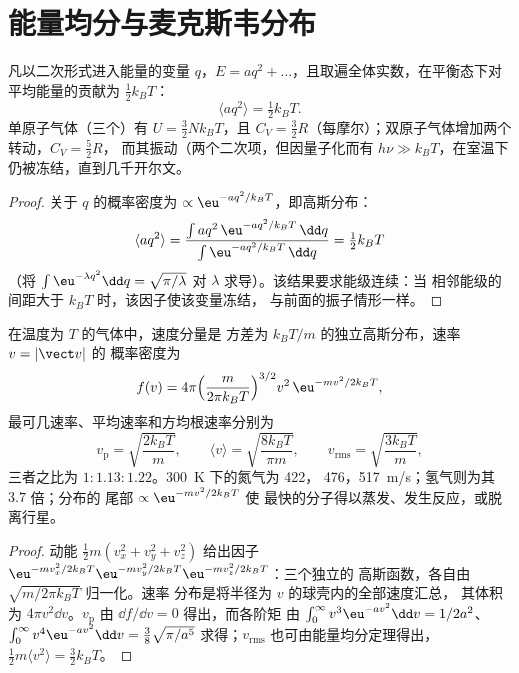 \section{能量均分与麦克斯韦分布}

\begin{theorem}[能量均分定理]\label{thm:b2:boltzmann-factor:equipartition}
凡以二次形式进入能量的变量 $q$，$E = aq^2 +
\dots$，且取遍全体实数，在平衡态下对
平均能量的贡献为 $\tfrac12k_BT$：
\[
\langle aq^2\rangle = \tfrac12k_BT .
\]
单原子气体（三个）有 $U = \tfrac32Nk_BT$，且 $C_V =
\tfrac32R$（每摩尔）；双原子气体增加两个转动，$C_V = \tfrac52R$，
而其振动（两个二次项，但因量子化而有 $h\nu \gg
k_BT$，在室温下仍被冻结，直到几千开尔文。
\end{theorem}

\begin{proof}
关于 $q$ 的概率密度为 $\propto\eu^{-aq^2/k_BT}$，即高斯分布：
\[
\langle aq^2\rangle = \frac{\int aq^2\,\eu^{-aq^2/k_BT}\,\dd q}{\int\eu^{-aq^2/k_BT}\,\dd q} = \tfrac12k_BT
\]
（将 $\int\eu^{-\lambda q^2}\dd q = \sqrt{\pi/\lambda}$ 对
$\lambda$ 求导）。该结果要求能级连续：当
相邻能级的间距大于 $k_BT$ 时，该因子使该变量冻结，
与前面的振子情形一样。
\end{proof}

\begin{theorem}[麦克斯韦速率分布]\label{thm:b2:boltzmann-factor:maxwell}
在温度为 $T$ 的气体中，速度分量是
方差为 $k_BT/m$ 的独立高斯分布，速率 $v = |\vect v|$ 的
概率密度为
\[
f(v) = 4\pi\Big(\frac{m}{2\pi k_BT}\Big)^{3/2}v^2\,\eu^{-mv^2/2k_BT} ,
\]
最可几速率、平均速率和方均根速率分别为
\[
v_{\text{p}} = \sqrt{\frac{2k_BT}{m}}, \qquad
\langle v\rangle = \sqrt{\frac{8k_BT}{\pi m}}, \qquad
v_{\text{rms}} = \sqrt{\frac{3k_BT}{m}} ,
\]
三者之比为 $1 : 1.13 : 1.22$。\qty{300}{K} 下的氮气为 \qty{422}{}，
\qty{476}{}，\qty{517}{m/s}；氢气则为其 $3.7$ 倍；分布的
尾部 $\propto\eu^{-mv^2/2k_BT}$ 使
最快的分子得以蒸发、发生反应，或脱离行星。
\end{theorem}

\begin{proof}
动能 $\tfrac12m(v_x^2 + v_y^2 + v_z^2)$ 给出因子
$\eu^{-mv_x^2/2k_BT}\eu^{-mv_y^2/2k_BT}\eu^{-mv_z^2/2k_BT}$：三个独立的
高斯函数，各自由 $\sqrt{m/2\pi k_BT}$ 归一化。速率
分布是将半径为 $v$ 的球壳内的全部速度汇总，
其体积为 $4\pi v^2\dd v$。$v_{\text{p}}$ 由 $\dd f/\dd v = 0$ 得出，而各阶矩
由 $\int_0^\infty v^3\eu^{-av^2}\dd v = 1/2a^2$、$\int_0^\infty
v^4\eu^{-av^2}\dd v = \tfrac38\sqrt{\pi/a^5}$ 求得；$v_{\text{rms}}$ 也可由能量均分定理得出，
$\tfrac12m\langle v^2\rangle = \tfrac32k_BT$。
\end{proof}

